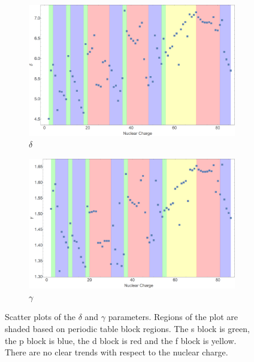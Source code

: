 \begin{figure}
\centering
\begin{subfigure}[b]{0.49\textwidth}
	\includegraphics[width=\textwidth]{Figures/BS_non_rel_delta.png}
	\caption{$\delta$}
\end{subfigure}
\begin{subfigure}[b]{0.49\textwidth}
	\includegraphics[width=\textwidth]{Figures/BS_non_rel_gamma.png}
	\caption{$\gamma$}
\end{subfigure}	
\caption[Scatter plots of the $\delta$ and $\gamma$ parameters.]{Scatter plots of the $\delta$ and $\gamma$ parameters. Regions of the plot are shaded based on periodic table block regions. The s block is green, the p block is blue, the d block is red and the f block is yellow. There are no clear trends with respect to the nuclear charge.}
\label{fig:BS_non_rel_delt_gamm}
\end{figure}

